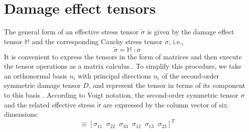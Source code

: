 \documentclass[12pt,a4paper,twoside,openright]{report}
\begin{document}
\section{Damage effect tensors}\label{Matrix Representation of Damage effect tensors}
\indent\indent\indent The general form of an effective stress tensor $\tilde{\sigma}$ is given by the damage effect tensor $\mathbb{M}$ and the corresponding Cauchy stress tensor $\sigma$, i.e.,
\begin{equation}
\tilde{\sigma}  = \mathbb{M} \; :  \sigma 
\label{eqn:effective_stress_tensor} 
\end{equation}
It is convenient to express the tensors in the form of matrices and then execute the tensor operations as a matrix calculus.. To simplify this procedure, we take an orthonormal basis ${n_{i}}$ with principal directions $n_{i}$ of the second-order symmetric damage tensor $D$, and represent the tensor in terms of its component to this basis \citep{murakami2012continuum}. According to Voigt notation, the second-order symmetric tensor $\sigma$ and the related effective stress $\tilde{\sigma}$ are expressed by the column vector of six dimensions:
\begin{equation}
   [\sigma_{P}]  \equiv  [\sigma_{11} \;\; \sigma_{22} \;\;\sigma_{33} \;\;\sigma_{12} \;\;\sigma_{13} \;\;\sigma_{23} ]^{T}
\end{equation}
\end{document}
